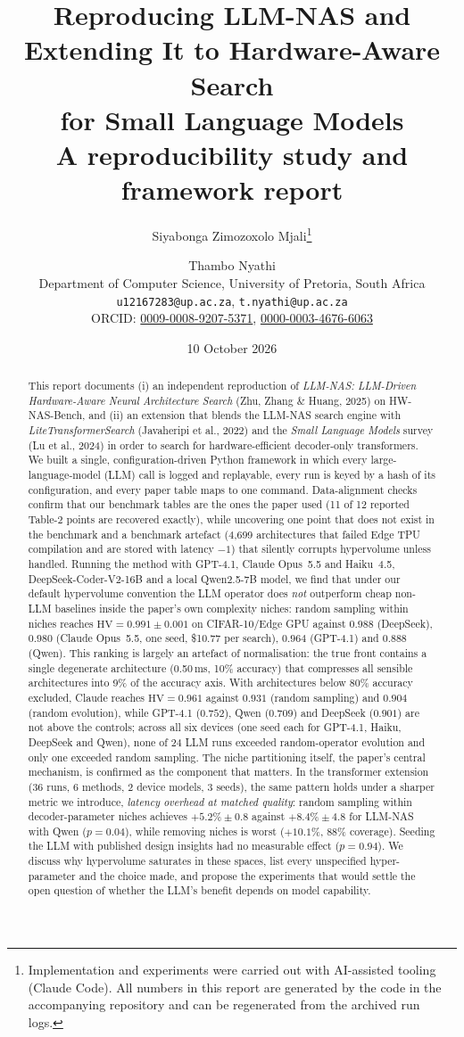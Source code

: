 \documentclass[11pt,a4paper]{article}
\title{\textbf{Reproducing LLM-NAS and Extending It to Hardware-Aware Search\\ for Small Language Models}\\[4pt]
\large A reproducibility study and framework report}
\author{Siyabonga Zimozoxolo Mjali\thanks{Implementation and experiments were carried out with AI-assisted tooling (Claude Code). All numbers in this report are generated by the code in the accompanying repository and can be regenerated from the archived run logs.} \and Thambo Nyathi\\[4pt]
\small Department of Computer Science, University of Pretoria, South Africa\\
\small \texttt{u12167283@up.ac.za}, \texttt{t.nyathi@up.ac.za}\\
\small ORCID: \href{https://orcid.org/0009-0008-9207-5371}{0009-0008-9207-5371}, \href{https://orcid.org/0000-0003-4676-6063}{0000-0003-4676-6063}}
\date{10 October 2026}
\newcommand{\HV}{\mathrm{HV}}
\begin{document}
\maketitle

\begin{abstract}
This report documents (i) an independent reproduction of \emph{LLM-NAS: LLM-Driven Hardware-Aware Neural Architecture Search} (Zhu, Zhang \& Huang, 2025) on HW-NAS-Bench, and (ii) an extension that blends the LLM-NAS search engine with \emph{LiteTransformerSearch} (Javaheripi et al., 2022) and the \emph{Small Language Models} survey (Lu et al., 2024) in order to search for hardware-efficient decoder-only transformers. We built a single, configuration-driven Python framework in which every large-language-model (LLM) call is logged and replayable, every run is keyed by a hash of its configuration, and every paper table maps to one command. Data-alignment checks confirm that our benchmark tables are the ones the paper used (11 of 12 reported Table-2 points are recovered exactly), while uncovering one point that does not exist in the benchmark and a benchmark artefact (4{,}699 architectures that failed Edge TPU compilation and are stored with latency $-1$) that silently corrupts hypervolume unless handled. Running the method with GPT-4.1, Claude Opus~5.5 and Haiku~4.5, DeepSeek-Coder-V2-16B and a local Qwen2.5-7B model, we find that under our default hypervolume convention the LLM operator does \emph{not} outperform cheap non-LLM baselines inside the paper's own complexity niches: random sampling within niches reaches $\HV=0.991\pm0.001$ on CIFAR-10/Edge GPU against $0.988$ (DeepSeek), $0.980$ (Claude Opus~5.5, one seed, \$10.77 per search), $0.964$ (GPT-4.1) and $0.888$ (Qwen). This ranking is largely an artefact of normalisation: the true front contains a single degenerate architecture (0.50\,ms, 10\% accuracy) that compresses all sensible architectures into 9\% of the accuracy axis. With architectures below 80\% accuracy excluded, Claude reaches $\HV=0.961$ against $0.931$ (random sampling) and $0.904$ (random evolution), while GPT-4.1 ($0.752$), Qwen ($0.709$) and DeepSeek ($0.901$) are not above the controls; across all six devices (one seed each for GPT-4.1, Haiku, DeepSeek and Qwen), none of 24 LLM runs exceeded random-operator evolution and only one exceeded random sampling. The niche partitioning itself, the paper's central mechanism, is confirmed as the component that matters. In the transformer extension (36 runs, 6 methods, 2 device models, 3 seeds), the same pattern holds under a sharper metric we introduce, \emph{latency overhead at matched quality}: random sampling within decoder-parameter niches achieves $+5.2\%\pm0.8$ against $+8.4\%\pm4.8$ for LLM-NAS with Qwen ($p=0.04$), while removing niches is worst ($+10.1\%$, 88\% coverage). Seeding the LLM with published design insights had no measurable effect ($p=0.94$). We discuss why hypervolume saturates in these spaces, list every unspecified hyper-parameter and the choice made, and propose the experiments that would settle the open question of whether the LLM's benefit depends on model capability.
\end{abstract}
\end{document}

